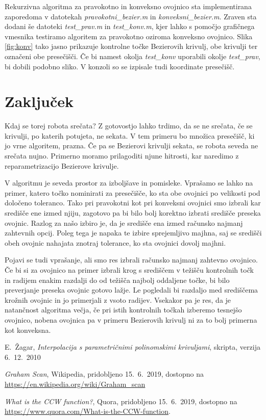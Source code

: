 \documentclass[a4paper, 12pt]{article} %
\begin{document}
Rekurzivna algoritma za pravokotno in konveksno ovojnico sta implementirana zaporedoma v datotekah \emph{pravokotni\_bezier.m} in \emph{konveksni\_bezier.m}.
Zraven sta dodani še datoteki \emph{test\_prav.m} in \emph{test\_konv.m}, kjer lahko s pomočjo grafičnega vmesnika testiramo algoritem za pravokotno oziroma konveksno ovojnico.
Slika \ref{fig:konv} tako jasno prikazuje kontrolne točke Bezierovih krivulj, obe krivulji ter označeni obe presečišči. Če bi namest okolja \emph{test\_konv} uporabili okolje \emph{test\_prav}, bi dobili podobno sliko. V konzoli so se izpisale tudi koordinate presečišč.


\section{Zaključek}

Kdaj se torej robota srečata? Z gotovostjo lahko trdimo, da se ne srečata, če se krivulji, po katerih potujeta, ne sekata. V tem primeru bo množica presečišč, ki jo vrne algoritem, prazna. Če pa se Bezierovi krivulji sekata, se robota seveda ne srečata nujno. Primerno moramo prilagoditi njune hitrosti, kar naredimo z reparametrizacijo Bezierove krivulje.

V algoritmu je seveda prostor za izboljšave in pomisleke. Vprašamo se lahko na primer, katero točko nominirati za presečišče, ko sta obe ovojnici po velikosti pod določeno toleranco. Tako pri pravokotni kot pri konveksni ovojnici smo izbrali kar središče ene izmed njiju, zagotovo pa bi bilo bolj korektno izbrati središče preseka ovojnic. Razlog za našo izbiro je, da je središče ena izmed računsko najmanj zahtevnih opcij. Poleg tega je napaka te izbire sprejemljivo majhna, saj se središči obeh ovojnic nahajata znotraj tolerance, ko sta ovojnici dovolj majhni.

Pojavi se tudi vprašanje, ali smo res izbrali računsko najmanj zahtevno ovojnico. Če bi si za ovojnico na primer izbrali krog s središčem v težišču kontrolnih točk in radijem enakim razdalji do od težišča najbolj oddaljene točke, bi bilo preverjanje preseka ovojnic gotovo lažje. Le pogledali bi razdaljo med središčema krožnih ovojnic in jo primerjali z vsoto radijev.
Vsekakor pa je res, da je natančnost algoritma večja, če pri istih kontrolnih točkah izberemo tesnejšo ovojnico, nobena ovojnica pa v primeru Bezierovih krivulj ni za to bolj primerna kot konveksna.

\begin{thebibliography}{9}

E.~Žagar, \emph{Interpolacija s parametričnimi polinomskimi krivuljami}, skripta, verzija 6.~12.~2010

\emph{Graham Scan}, Wikipedia, pridobljeno 15.~6.~2019, dostopno na \url{https://en.wikipedia.org/wiki/Graham_scan}

\emph{What is the CCW function?}, Quora, pridobljeno 15.~6.~2019, dostopno na \url{https://www.quora.com/What-is-the-CCW-function}.
\end{thebibliography}
\end{document}
